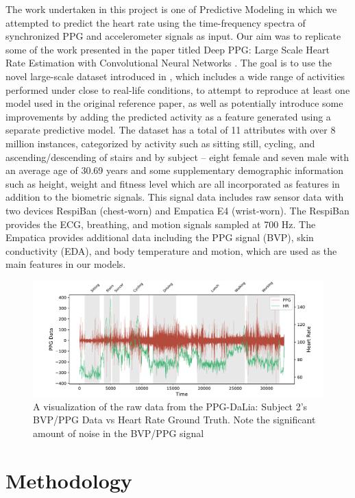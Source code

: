 \documentclass[12pt, conference]{IEEEtran}
\begin{document}
The work undertaken in this project is one of Predictive Modeling in which we attempted to predict the heart rate using the time-frequency spectra of synchronized PPG and accelerometer signals as input. Our aim was to replicate some of the work presented in the paper titled Deep PPG: Large Scale Heart Rate Estimation with Convolutional Neural Networks \cite{reiss2019deep}. The goal is to use the novel large-scale dataset introduced in \cite{reiss2019deep}, which includes a wide range of activities performed under close to real-life conditions, to attempt to reproduce at least one model used in the original reference paper, as well as potentially introduce some improvements by adding the predicted activity as a feature generated using a separate predictive model. The dataset has a total of 11 attributes with over 8 million instances, categorized by activity such as sitting still, cycling, and ascending/descending of stairs and by subject -- eight female and seven male with an average age of 30.69 years and some supplementary demographic information such as height, weight and fitness level which are all incorporated as features in addition to the biometric signals. This signal data includes raw sensor data with two devices RespiBan (chest-worn) and Empatica E4 (wrist-worn). The RespiBan provides the ECG, breathing, and motion signals sampled at 700 Hz. The Empatica provides additional data including the PPG signal (BVP), skin conductivity (EDA), and body temperature and motion, which are used as the main features in our models.


\begin{figure}[!t]
  \centering
  \includegraphics[width=7in]{image5}
  \caption{A visualization of the raw data from the PPG-DaLia: Subject 2’s BVP/PPG Data vs Heart Rate Ground Truth. Note the significant amount of noise in the BVP/PPG signal}
  \label{fig_1}
  \end{figure}

\section{Methodology}
\end{document}
